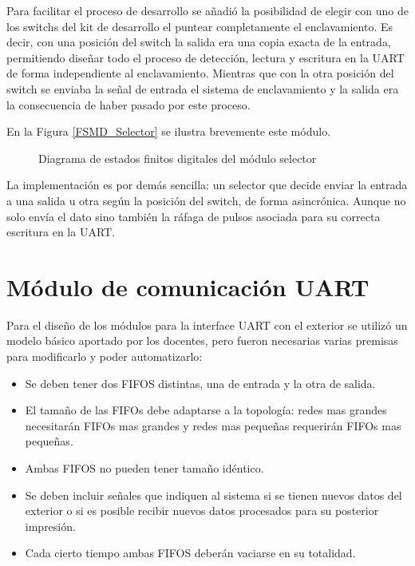 		Para facilitar el proceso de desarrollo se añadió la posibilidad de elegir con uno de los switchs del kit de desarrollo el puntear completamente el enclavamiento. Es decir, con una posición del switch la salida era una copia exacta de la entrada, permitiendo diseñar todo el proceso de detección, lectura y escritura en la UART de forma independiente al enclavamiento. Mientras que con la otra posición del switch se enviaba la señal de entrada el sistema de enclavamiento y la salida era la consecuencia de haber pasado por este proceso.
		
		En la Figura \ref{FSMD_Selector} se ilustra brevemente este módulo.
		
		\begin{figure}[h]
		\centering
			\caption{Diagrama de estados finitos digitales del módulo selector}
			\label{fig:FSMD_Selector}
		\end{figure}	
		
		La implementación es por demás sencilla: un selector que decide enviar la entrada a una salida u otra según la posición del switch, de forma asincrónica. Aunque no solo envía el dato sino también la ráfaga de pulsos asociada para su correcta escritura en la UART.
		
\section{Módulo de comunicación UART}

	Para el diseño de los módulos para la interface UART con el exterior se utilizó un modelo básico aportado por los docentes, pero fueron necesarias varias premisas para modificarlo y poder automatizarlo:
	
	\begin{itemize}
		\item Se deben tener dos FIFOS distintas, una de entrada y la otra de salida.
		\item El tamaño de las FIFOs debe adaptarse a la topología: redes mas grandes necesitarán FIFOs mas grandes y redes mas pequeñas requerirán FIFOs mas pequeñas.
		\item Ambas FIFOS no pueden tener tamaño idéntico.
		\item Se deben incluir señales que indiquen al sistema si se tienen nuevos datos del exterior o si es posible recibir nuevos datos procesados para su posterior impresión.
		\item Cada cierto tiempo ambas FIFOS deberán vaciarse en su totalidad.		
	\end{itemize}
	
